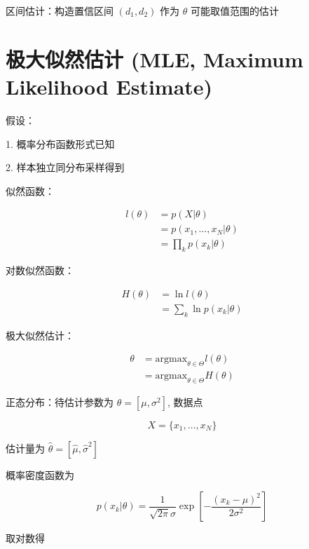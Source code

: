 \documentclass[openany,a4paper,12pt]{ctexbook}
\theoremstyle{kaiti}
\theoremstyle{normal}
\begin{document}
区间估计：构造置信区间 $\left(d_1,d_2 \right)$ 作为 $\theta$ 可能取值范围的估计

\section{极大似然估计 (MLE, Maximum Likelihood Estimate) }

假设：

1. 概率分布函数形式已知

2. 样本独立同分布采样得到

似然函数：

\begin{equation}
\begin{aligned}
  l(\theta)
  &=p(X|\theta)\\
  &=p(x_1,\dots ,x_N|\theta)\\
  &=\prod_kp(x_k|\theta)
\end{aligned}
\end{equation}

对数似然函数：

\begin{equation}
\begin{aligned}
  H(\theta)
  &=\ln l(\theta)\\
  &=\sum_k\ln p(x_k|\theta)
\end{aligned}
\end{equation}

极大似然估计：

\begin{equation}
\begin{aligned}
  \theta 
  &=\mathrm{argmax}_{\theta\in\Theta} l(\theta)\\
  &=\mathrm{argmax}_{\theta\in\Theta} H(\theta)
\end{aligned}
\end{equation}

正态分布：待估计参数为 $\theta=[\mu,\sigma^2]$, 数据点 

\begin{equation}
X=\{ x_1,\dots,x_N\}
\end{equation}

估计量为 $\hat{\theta}=[\hat{\mu},\hat{\sigma}^2]$

概率密度函数为

\begin{equation}
p(x_k|\theta)=\frac{1}{\sqrt{2\pi}\sigma}\exp \left[-\frac{(x_k-\mu)^2}{2\sigma^2} \right]
\end{equation}

取对数得
\end{document}
